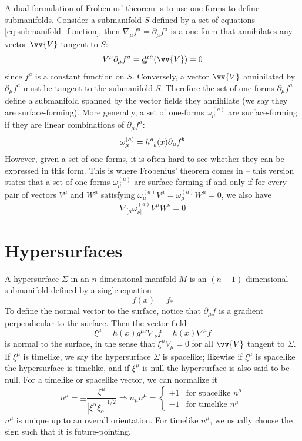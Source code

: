 \documentclass[11pt,table]{article}
\newcommand{\form}[1]{\underaccent{\tilde}{#1}}
\begin{document}
A dual formulation of Frobenius' theorem is to use one-forms to define submanifolds. Consider a submanifold $S$ defined by a set of equations \eqref{eq:submanifold_function}, then $\nabla_\mu f^a = \partial_\mu f^a$ is a one-form that annihilates any vector $\vv{V}$ tangent to $S$:
\begin{equation}
V^\mu \partial_\mu f^a = \form{d}f^a(\vv{V}) = 0
\end{equation}
since $f^a$ is a constant function on $S$. Conversely, a vector $\vv{V}$ annihilated by $\partial_\mu f^a$ must be tangent to the submanifold $S$. Therefore the set of one-forms $\partial_\mu f^a$ define a submanifold spanned by the vector fields they annihilate (we say they are surface-forming). More generally, a set of one-forms $\omega_\mu^{(a)}$ are surface-forming if they are linear combinations of $\partial_\mu f^a$:
\begin{equation}
\omega_\mu^{(a)} = \tensor{h}{^a_b}(x)\partial_\mu f^b
\end{equation}
However, given a set of one-forms, it is often hard to see whether they can be expressed in this form. This is where Frobenius' theorem comes in -- this version states that a set of one-forms $\omega_\mu^{(a)}$ are surface-forming if and only if for every pair of vectors $V^{\mu}$ and $W^{\mu}$ satisfying $\omega_\mu^{(a)}V^{\mu} = \omega_\mu^{(a)}W^{\mu} = 0$, we also have
\begin{equation}
\nabla_{[\mu} \omega_{\nu]}^{(a)} V^\mu W^\nu = 0
\end{equation}

\section{Hypersurfaces}

A hypersurface $\Sigma$ in an $n$-dimensional manifold $M$ is an $(n-1)$-dimensional submanifold defined by a single equation
\begin{equation}
f(x) = f_*
\end{equation}
To define the normal vector to the surface, notice that $\partial_\mu f$ is a gradient perpendicular to the surface. Then the vector field
\begin{equation}
\xi^\mu = h(x) g^{\mu\nu} \nabla_{\nu} f = h(x) \nabla^{\mu} f
\end{equation}
is normal to the surface, in the sense that $\xi^\mu V_\mu=0$ for all $\vv{V}$ tangent to $\Sigma$. If $\xi^{\mu}$ is timelike, we say the hypersurface $\Sigma$ is spacelike; likewise if $\xi^{\mu}$ is spacelike the hypersurface is timelike, and if $\xi^{\mu}$ is null the hypersurface is also said to be null. For a timelike or spacelike vector, we can normalize it
\begin{equation}
n^{\mu} = \pm\frac{\xi^{\mu}}{|\xi^{\alpha}\xi_{\alpha}|^{1/2}} \Rightarrow n_{\mu}n^{\mu} = \begin{cases}
+1 &\text{for spacelike } n^{\mu} \\
-1 &\text{for timelike } n^{\mu}
\end{cases}
\end{equation}
$n^{\mu}$ is unique up to an overall orientation. For timelike $n^{\mu}$, we usually choose the sign such that it is future-pointing.
\end{document}
